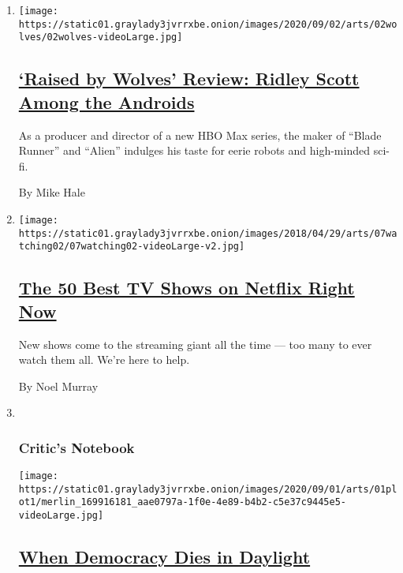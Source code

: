 \begin{enumerate}
\def\labelenumi{\arabic{enumi}.}
\item
  \texttt{[image: https://static01.graylady3jvrrxbe.onion/images/2020/09/02/arts/02wolves/02wolves-videoLarge.jpg]}

  \hypertarget{raised-by-wolves-review-ridley-scott-among-the-androids}{%
  \subsection{\texorpdfstring{\href{/2020/09/02/arts/television/raised-by-wolves-review.html}{`Raised
  by Wolves' Review: Ridley Scott Among the
  Androids}}{`Raised by Wolves' Review: Ridley Scott Among the Androids}}\label{raised-by-wolves-review-ridley-scott-among-the-androids}}

  As a producer and director of a new HBO Max series, the maker of
  ``Blade Runner'' and ``Alien'' indulges his taste for eerie robots and
  high-minded sci-fi.

  By Mike Hale
\item
  \texttt{[image: https://static01.graylady3jvrrxbe.onion/images/2018/04/29/arts/07watching02/07watching02-videoLarge-v2.jpg]}

  \hypertarget{the-50-best-tv-shows-on-netflix-right-now}{%
  \subsection{\texorpdfstring{\href{/article/best-tv-shows-netflix.html}{The
  50 Best TV Shows on Netflix Right
  Now}}{The 50 Best TV Shows on Netflix Right Now}}\label{the-50-best-tv-shows-on-netflix-right-now}}

  New shows come to the streaming giant all the time --- too many to
  ever watch them all. We're here to help.

  By Noel Murray
\item ~
  \hypertarget{critics-notebook}{%
  \subsubsection{Critic's Notebook}\label{critics-notebook}}

  \texttt{[image: https://static01.graylady3jvrrxbe.onion/images/2020/09/01/arts/01plot1/merlin\_169916181\_aae0797a-1f0e-4e89-b4b2-c5e37c9445e5-videoLarge.jpg]}

  \hypertarget{when-democracy-dies-in-daylight}{%
  \subsection{\texorpdfstring{\href{/2020/09/01/arts/television/plot-against-america-election.html}{When
  Democracy Dies in
  Daylight}}{When Democracy Dies in Daylight}}\label{when-democracy-dies-in-daylight}}


\end{enumerate}
